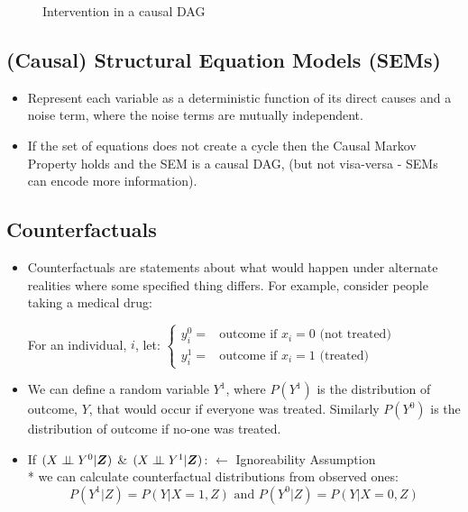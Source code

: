 \documentclass[a0,landscape,25pt,plainsections]{sciposter}
\begin{document}
\begin{multicols}{5}
\begin{figure}
\caption{Intervention in a causal DAG}
\label{fig:intervention}
\centering
{}
\end{figure}

\subsection*{(Causal) Structural Equation Models (SEMs)}
\begin{itemize}
\item Represent each variable as a deterministic function of its direct causes and a noise term, where the noise terms are mutually independent.

\item If the set of equations does not create a cycle then the Causal Markov Property holds and the SEM is a causal DAG, (but not visa-versa - SEMs can encode more information).
\end{itemize}


\subsection*{Counterfactuals}
\begin{itemize}
\item Counterfactuals are statements about what would happen under alternate realities where some specified thing differs. For example, consider people taking a medical drug:

For an individual, $i$, let: $\begin{cases}y^{0}_{i} =& \text{outcome if $x_{i}=0$ (not treated)} \\ y^{1}_{i} =& \text{outcome if $x_{i}=1$ (treated)}
\end{cases}$ 

\item We can define a random variable $Y^{1}$, where $P(Y^{1})$ is the distribution of outcome, $Y$, that would occur if everyone was treated. Similarly $P(Y^{0})$ is the distribution of outcome if no-one was treated. 
\item If   $(X \perp\!\!\!\perp Y^{0}|\boldsymbol{Z})$ \&  $(X\perp\!\!\!\perp Y^{1}|\boldsymbol{Z})$:  $\longleftarrow$ Ignoreability Assumption \\*
we can calculate counterfactual distributions from observed ones:
\begin{equation*}
P(Y^{1}|Z) = P(Y|X=1,Z) \text{ and } P(Y^{0}|Z) = P(Y|X=0,Z)
\end{equation*}


\end{itemize}
\end{multicols}
\end{document}
